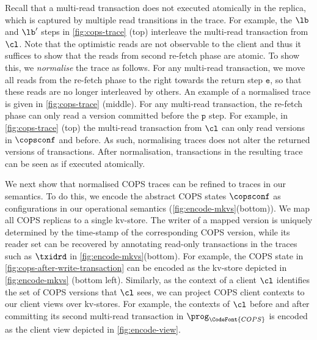 Recall that a multi-read transaction does not executed atomically in the replica,
which is captured by multiple read transitions in the trace.
For example, the \( \lb\) and \( \lb' \) steps in \cref{fig:cops-trace} (top)
interleave the multi-read transaction from \( \cl \).
Note that the optimistic reads are not observable to the client and
thus it suffices to show that the reads from second re-fetch phase are atomic.
To show this, we \emph{normalise} the trace as follows. 
For any multi-read transaction, 
we move all reads from the re-fetch phase to the right towards the return step \( \mathtt{e}\),
so that these reads are no longer interleaved by others.
An example of a normalised trace is given in \cref{fig:cops-trace} (middle).
For any multi-read transaction,
the re-fetch phase can only read a version committed before the \( \mathtt{p}\) step.
For example, in \cref{fig:cops-trace} (top)
the multi-read transaction from \( \cl \) can only read versions in \( \copsconf \) and before.
As such, normalising traces does not alter the returned versions of transactions.
After normalisation, transactions in the resulting trace can be seen as if executed atomically. 

We next show that normalised COPS traces can be refined to traces in our semantics.
To do this, we encode the abstract COPS states \(\copsconf \) as configurations
in our operational semantics (\cref{fig:encode-mkvs}(bottom)). 
We map all COPS replicas to a single kv-store.
The writer of a mapped version is uniquely
determined by the time-stamp of the corresponding COPS version, 
while its reader set 
can be recovered by annotating read-only transactions in the traces such as \( \txidrd \) in \cref{fig:encode-mkvs}(bottom).
For example, the COPS state in \cref{fig:cops-after-write-transaction}
can be encoded as the kv-store depicted in \cref{fig:encode-mkvs} (bottom left).
Similarly, as the context of a client $\cl$ identifies the set of COPS versions that $\cl$ sees, 
we can project COPS client contexts to our client views over kv-stores. 
For example, the contexts of \( \cl \) 
before and after committing its second multi-read transaction in \( \prog_{\CodeFont{COPS}} \) 
is encoded as the client view depicted in \cref{fig:encode-view}.



